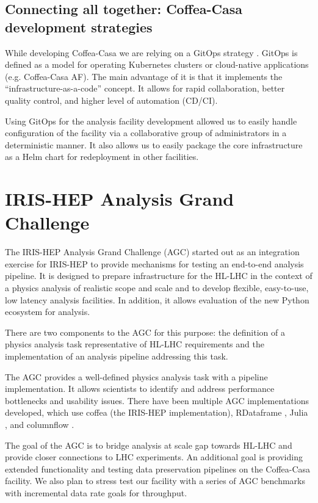\documentclass{webofc}
\begin{document}
\subsection{Connecting all together: Coffea-Casa development strategies}

While developing Coffea-Casa we are relying on a GitOps strategy \cite{beetz2021gitops}. GitOps is defined as a model for operating Kubernetes clusters or cloud-native applications (e.g. Coffea-Casa AF). The main advantage of it is that it implements the “infrastructure-as-a-code” concept. It allows for rapid collaboration, better quality control, and higher level of automation (CD/CI).

Using GitOps for the analysis facility development allowed us to easily handle configuration of the facility via a collaborative group of administrators in a deterministic manner. It also allows us to easily package the core infrastructure as a Helm chart for redeployment in other facilities.

\section{IRIS-HEP Analysis Grand Challenge}

The IRIS-HEP Analysis Grand Challenge (AGC) \cite{held_alexander_2022} started out as an integration exercise for IRIS-HEP to provide mechanisms for testing an end-to-end analysis pipeline. It is designed to prepare infrastructure  for the HL-LHC in the context of a physics analysis of realistic scope and scale and to develop flexible, easy-to-use, low latency analysis facilities.  In addition, it allows evaluation of the new Python ecosystem for analysis. 

There are two components to the AGC \cite{agc_code} for this purpose: the definition of a physics analysis task representative of HL-LHC requirements and the implementation of an analysis pipeline addressing this task.

The AGC provides a well-defined physics analysis task with a pipeline implementation. It allows scientists to identify and address performance bottlenecks and usability issues. There have been multiple AGC implementations developed, which use coffea \cite{coffea} (the IRIS-HEP implementation), RDataframe \cite{piparo2019rdataframe}, Julia \cite{bezanson2017julia}, and columnflow \cite{cf}. 

The goal of the AGC is to bridge analysis at scale gap towards HL-LHC and provide closer connections to LHC experiments.  An additional goal is providing extended functionality and testing data preservation pipelines on the Coffea-Casa facility. We also plan to stress test our facility with a series of AGC benchmarks with incremental data rate goals for throughput.
\end{document}
